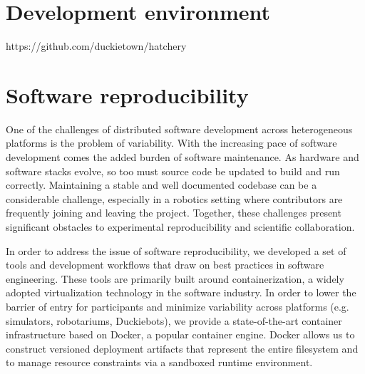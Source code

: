 \documentclass[12pt,initial,twoside,maitrise]{dms}
\numberwithin{equation}{section}
\numberwithin{table}{chapter}
\numberwithin{figure}{chapter}
\begin{document}
    \chapter*{Development environment}

    https://github.com/duckietown/hatchery

    \chapter*{Software reproducibility}

    One of the challenges of distributed software development across heterogeneous platforms is the problem of variability. With the increasing pace of software development comes the added burden of software maintenance. As hardware and software stacks evolve, so too must source code be updated to build and run correctly. Maintaining a stable and well documented codebase can be a considerable challenge, especially in a robotics setting where contributors are frequently joining and leaving the project. Together, these challenges present significant obstacles to experimental reproducibility and scientific collaboration.

    In order to address the issue of software reproducibility, we developed a set of tools and development workflows that draw on best practices in software engineering. These tools are primarily built around containerization, a widely adopted virtualization technology in the software industry. In order to lower the barrier of entry for participants and minimize variability across platforms (e.g. simulators, robotariums, Duckiebots), we provide a state-of-the-art container infrastructure based on Docker, a popular container engine. Docker allows us to construct versioned deployment artifacts that represent the entire filesystem and to manage resource constraints via a sandboxed runtime environment.
\end{document}
